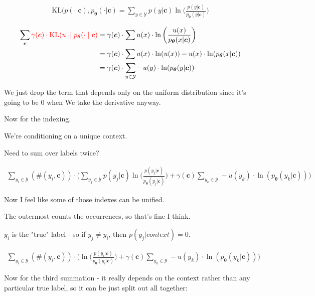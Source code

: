 \documentclass{article}
\newcommand{\KL}{\mathrm{KL}}
\newcommand{\uniform}{u}
\newcommand{\vtheta}{\boldsymbol{\theta}}
\newcommand{\model}{p_{\vtheta}}
\newcommand{\context}{\boldsymbol{c}}
\begin{document}
			\begin{align}
				\KL(p(\cdot|\context), \model(\cdot|\context) = \sum_{y\in\mathcal{Y}} p(y|\context)\ln\bigg(\frac{p(y|\context)}{\model(y|\context)} \bigg)
			\end{align}
			
			\begin{align}
				\sum_{\context} {\color{red}\gamma(\context) \cdot 						\KL(\uniform \mid\mid \model(\cdot \mid \context)} &= \gamma(\context)\cdot\sum u(x)\cdot \ln\bigg(\frac{u(x)}{\model(x|\context)}\bigg)\\
			&= \gamma(\context)\cdot\sum u(x)\cdot\ln(u(x)) - u(x)\cdot\ln(\model(x|\context))\\
			&= \gamma(\context)\cdot\sum_{y\in\mathcal{Y}} - u(y)\cdot\ln(\model(y|\context))
			\end{align}
			
			We just drop the term that depends only on the uniform distribution since it's going to be 0 when We take the derivative anyway.
			
			Now for the indexing. 
			
			We're conditioning on a unique context.
			
			Need to sum over labels twice?
			
			\begin{align}
				\sum_{y_i\in\mathcal{Y}} (\#(y_i, \context))\cdot \bigg( \sum_{y_j\in\mathcal{Y}} p(y_j|\context)\ln\bigg(\frac{p(y_j|\context)}{\model(y_j|\context)} \bigg) + \gamma(\context)\sum_{y_k\in\mathcal{Y}} - u(y_k)\cdot\ln(\model(y_k|\context)) \bigg)
			\end{align}	
			
			Now I feel like some of those indexes can be unified.
			
			The outermost counts the occurrences, so that's fine I think.
			
			$y_i$ is the "true" label - so if $y_j\neq y_i$, then $p(y_j|context) = 0$. 
			
			\begin{align}
				\sum_{y_i\in\mathcal{Y}} (\#(y_i, \context))\cdot \bigg(  \ln\bigg(\frac{p(y_i|\context)}{\model(y_i|\context)} \bigg) + \gamma(\context)\sum_{y_k\in\mathcal{Y}} - u(y_k)\cdot\ln(\model(y_k|\context)) \bigg)
			\end{align}		
				
			Now for the third summation - it really depends on the context rather than any particular true label, so it can be just split out all together:
			
\end{document}

